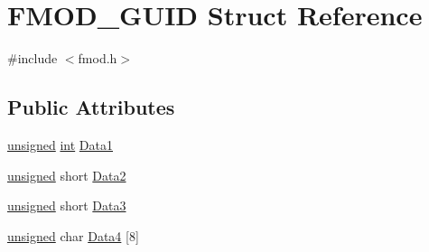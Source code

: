 \hypertarget{struct_f_m_o_d___g_u_i_d}{\section{F\-M\-O\-D\-\_\-\-G\-U\-I\-D Struct Reference}
\label{struct_f_m_o_d___g_u_i_d}
}


{\ttfamily \#include $<$fmod.\-h$>$}

\subsection*{Public Attributes}
\begin{DoxyCompactItemize}
\item 
\hyperlink{_free_image_8h_a425076c7067a1b5166e2cc530e914814}{unsigned} \hyperlink{wglew_8h_a500a82aecba06f4550f6849b8099ca21}{int} \hyperlink{struct_f_m_o_d___g_u_i_d_ade5cc5a3c9665147a488c8a9e2ea211c}{Data1}
\item 
\hyperlink{_free_image_8h_a425076c7067a1b5166e2cc530e914814}{unsigned} short \hyperlink{struct_f_m_o_d___g_u_i_d_ac5805cdbaf5cfa2113d637e11f6ad36e}{Data2}
\item 
\hyperlink{_free_image_8h_a425076c7067a1b5166e2cc530e914814}{unsigned} short \hyperlink{struct_f_m_o_d___g_u_i_d_a98f6f2f06cad235236cbc86099aa4e96}{Data3}
\item 
\hyperlink{_free_image_8h_a425076c7067a1b5166e2cc530e914814}{unsigned} char \hyperlink{struct_f_m_o_d___g_u_i_d_a3a1337ea3f0bec8fbddd197ebdb29cf7}{Data4} \mbox{[}8\mbox{]}
\end{DoxyCompactItemize}


